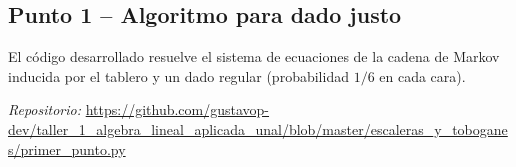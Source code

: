\subsection{Punto 1 – Algoritmo para dado justo}
 El código desarrollado resuelve el sistema de ecuaciones de la cadena de
 Markov inducida por el tablero y un dado regular (probabilidad $1/6$ en
 cada cara).
 
\vspace{0.3em}
\noindent\emph{Repositorio:} \url{https://github.com/gustavop-dev/taller_1_algebra_lineal_aplicada_unal/blob/master/escaleras_y_toboganes/primer_punto.py}